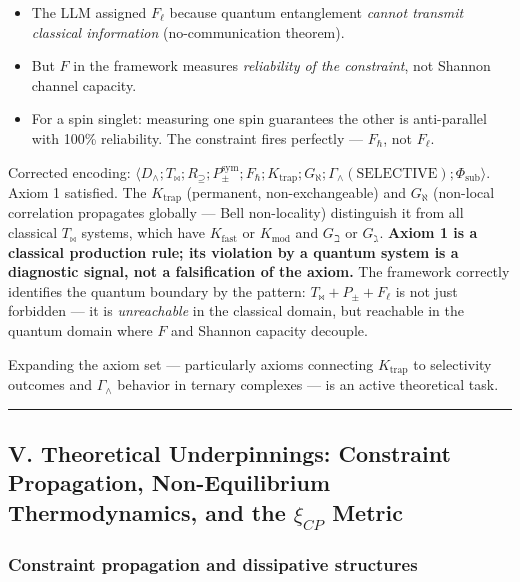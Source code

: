 \documentclass[12pt,a4paper]{article}
\begin{document}
\begin{itemize}
    \item The LLM assigned $F_{\ell}$ because quantum entanglement \emph{cannot transmit classical information} (no-communication theorem).
    \item But $F$ in the framework measures \emph{reliability of the constraint}, not Shannon channel capacity.
    \item For a spin singlet: measuring one spin guarantees the other is anti-parallel with 100\% reliability. The constraint fires perfectly --- $F_{\hbar}$, not $F_{\ell}$.
\end{itemize}

Corrected encoding: $\langle D_{\wedge}; T_{\bowtie}; R_{\supseteq}; P_{\pm}^{\text{sym}}; F_{\hbar}; K_{\text{trap}}; G_{\aleph}; \Gamma_{\wedge}(\text{SELECTIVE}); \Phi_{\text{sub}} \rangle$. Axiom 1 satisfied. The $K_{\text{trap}}$ (permanent, non-exchangeable) and $G_{\aleph}$ (non-local correlation propagates globally --- Bell non-locality) distinguish it from all classical $T_{\bowtie}$ systems, which have $K_{\text{fast}}$ or $K_{\text{mod}}$ and $G_{\beth}$ or $G_{\gimel}$. \textbf{Axiom 1 is a classical production rule; its violation by a quantum system is a diagnostic signal, not a falsification of the axiom.} The framework correctly identifies the quantum boundary by the pattern: $T_{\bowtie} + P_{\pm} + F_{\ell}$ is not just forbidden --- it is \emph{unreachable} in the classical domain, but reachable in the quantum domain where $F$ and Shannon capacity decouple.

Expanding the axiom set --- particularly axioms connecting $K_{\text{trap}}$ to selectivity outcomes and $\Gamma_{\wedge}$ behavior in ternary complexes --- is an active theoretical task.

\begin{center}
\rule{0.5\textwidth}{0.4pt}
\end{center}

\subsection{V. Theoretical Underpinnings: Constraint Propagation, Non-Equilibrium Thermodynamics, and the $\xi_{CP}$ Metric}

\subsubsection{Constraint propagation and dissipative structures}
\end{document}
